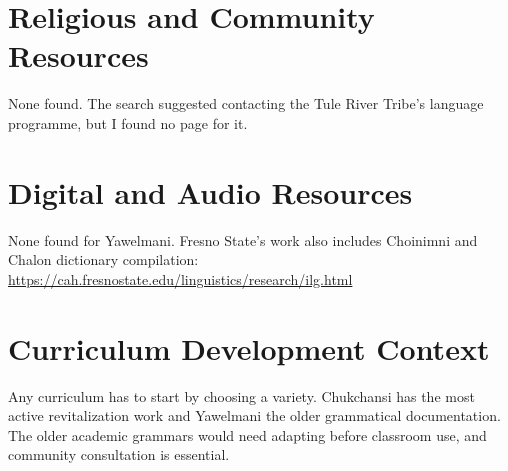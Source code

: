 \documentclass[12pt]{article}
\begin{document}
\section{Religious and Community Resources}
None found. The search suggested contacting the Tule River Tribe's language programme, but I found no page for it.

\section{Digital and Audio Resources}
None found for Yawelmani. Fresno State's work also includes Choinimni and Chalon dictionary compilation: \url{https://cah.fresnostate.edu/linguistics/research/ilg.html}

\section{Curriculum Development Context}
Any curriculum has to start by choosing a variety. Chukchansi has the most active revitalization work and Yawelmani the older grammatical documentation. The older academic grammars would need adapting before classroom use, and community consultation is essential.
\end{document}
